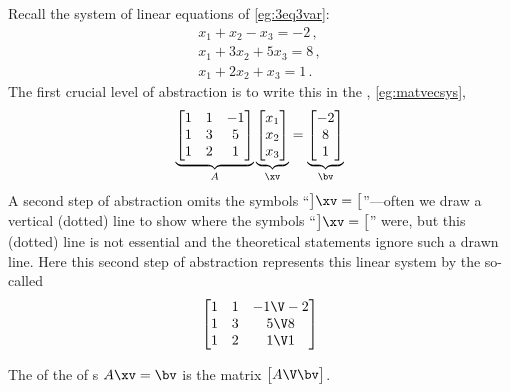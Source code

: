 \begin{example} 
Recall the system of linear equations of \cref{eg:3eq3var}:
\begin{equation*}
\begin{array}{l}
x_1+x_2-x_3=-2\,,\\
x_1+3x_2+5x_3=8\,,\\
x_1+2x_2+x_3=1\,.
\end{array}
\end{equation*}
The first crucial level of abstraction is to write this in the , \cref{eg:matvecsys},
\begin{equation*}
\underbrace{\begin{bmatrix} 1&1&-1\\ 1&3&5\\1&2&1 \end{bmatrix}}_A
\underbrace{\begin{bmatrix} x_1\\x_2\\x_3 \end{bmatrix}}_\xv
=\underbrace{\begin{bmatrix} -2\\8\\1 \end{bmatrix}}_\bv 
\end{equation*}
A second step of abstraction omits the symbols ``\(\big]\xv=\big[\)''---often we draw a vertical (dotted) line to show where the symbols ``\(\big]\xv=\big[\)'' were, but this (dotted) line is not essential and the theoretical statements ignore such a drawn line.
Here this second step of abstraction represents this linear system by the so-called 
\begin{equation*}
\begin{bmatrix} 1&1&-1\V -2\\ 1&3&5\V 8\\1&2&1\V 1 \end{bmatrix}
\end{equation*}
\end{example}


\begin{definition} \label{def:augmat}
The  of the  of s \(A\xv=\bv\) is the matrix \(\begin{bmatrix} A\V \bv \end{bmatrix}\).
\end{definition}

